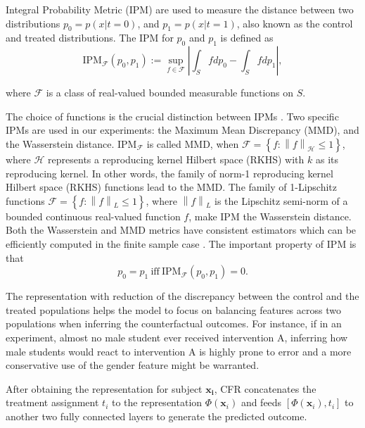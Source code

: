 \documentclass{article}
\begin{document}
Integral Probability Metric (IPM) are used to measure the distance between two distributions $p_0 = p(x|t = 0)$, and $p_1 = p(x|t = 1)$, also known as the control and treated distributions. The IPM for $p_0$ and $p_1$ is defined as
$$\mathrm{IPM}_{\mathcal{F}}(p_0, p_1) := \sup_{f\in \mathcal{F}} \left |\int_S f dp_0 -\int_S f d p_1 \right |,$$

where $\mathcal{F}$ is a class of real-valued bounded measurable functions on $S$. 

The choice of functions is the crucial distinction between IPMs \cite{Sriperumbudur2009-pf}. Two specific IPMs are used in our experiments: the Maximum Mean Discrepancy (MMD), and the Wasserstein distance. $\mathrm{IPM}_{\mathcal{F}}$ is called MMD, when $\mathcal{F} = \left \{ f : \left \| f \right \| _\mathcal{H}\leq 1\right \}$, where $\mathcal{H}$ represents a reproducing kernel Hilbert space (RKHS) with $k$ as its reproducing kernel. In other words, the family of norm-1 reproducing kernel Hilbert space (RKHS) functions lead to the MMD. The family of 1-Lipschitz functions $\mathcal{F} = \left \{ f:\left \| f\right \|_L \leq 1 \right \}$, where $\left \| f\right \|_L$ is the Lipschitz semi-norm of a bounded continuous real-valued function $f$, make IPM the Wasserstein distance. Both the Wasserstein and MMD metrics have consistent estimators which can be efficiently computed in the finite sample case \cite{Sriperumbudur2012-sz}. The important property of IPM is that $$p_0 = p_1~\mathrm{iff}~ \mathrm{IPM}_{\mathcal{F}}(p_0, p_1) = 0.$$

The representation with reduction of the discrepancy between the control and the treated populations helps the model to focus on balancing features across two populations when inferring the counterfactual outcomes. For instance, if in an experiment, almost no male student ever received intervention A, inferring how male students would react to intervention A is highly prone to error and a more conservative use of the gender feature might be warranted.

After obtaining the representation for subject $\mathbf{x_i}$, CFR
concatenates the treatment assignment $t_i$ to the representation $\Phi(\mathbf{x}_i)$ and feeds $[\Phi(\mathbf{x}_i), t_i]$ to another two fully connected layers to generate the predicted outcome.
\end{document}
